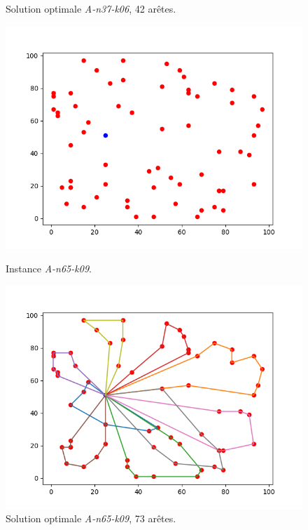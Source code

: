 \documentclass[a4paper,11pt]{article}%
\begin{document}
\begin{figure}[h!]
\begin{minipage}[c]{.46\linewidth}
        \caption{Solution optimale \emph{A-n37-k06}, 42 arêtes.}
        \label{SolA3706}
    \end{minipage}
    
    \begin{minipage}[c]{.46\linewidth}
        \centering
        \includegraphics[scale=0.4]{Instance6509}
        
        \caption{Instance \emph{A-n65-k09}.}
        \label{A6509}
    \end{minipage}
    \hfill%
    \begin{minipage}[c]{.46\linewidth}
        \centering
        \includegraphics[scale=0.4]{Solution6509}
        
        \caption{Solution optimale \emph{A-n65-k09}, 73 arêtes.}
        \label{SolA6509}
    \end{minipage}    
    

\end{figure}
\end{document}
